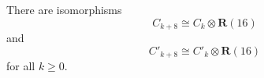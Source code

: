 There are isomorphisms
$$
C_{k+8} \cong C_k \otimes \mathbf{R}(16)
$$
and
$$
C'_{k+8} \cong C'_k \otimes \mathbf{R}(16)
$$
for all $k \geq 0$.
